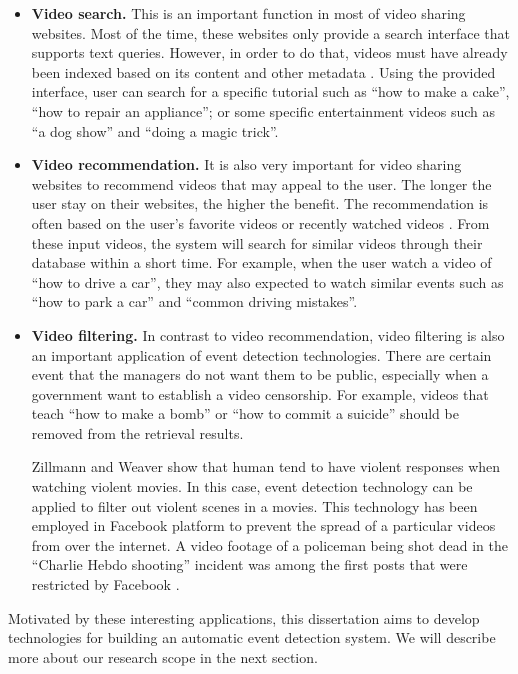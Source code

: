 \begin{itemize}
	\item \textbf{Video search.} This is an important function in most of video sharing websites. Most of the time, these websites only provide a search interface that supports text queries. However, in order to do that, videos must have already been indexed based on its content and other metadata \cite{zhang1997integrated}. Using the provided interface, user can search for a specific tutorial such as ``how to make a cake'',  ``how to repair an appliance''; or some specific entertainment videos such as ``a dog show'' and ``doing a magic trick''.
	\item \textbf{Video recommendation.} It is also very important for video sharing websites to recommend videos that may appeal to the user. The longer the user stay on their websites, the higher the benefit. The recommendation is often based on the user's favorite videos or recently watched videos \cite{davidson2010youtube,mei2007automatic}. From these input videos, the system will search for similar videos through their database within a short time. For example, when the user watch a video of ``how to drive a car'', they may also expected to watch similar events such as ``how to park a car'' and ``common driving mistakes''.
	\item \textbf{Video filtering.} In contrast to video recommendation, video filtering is also an important application of event detection technologies. There are certain event that the managers do not want them to be public, especially when a government want to establish a video censorship. For example, videos that teach ``how to make a bomb'' or ``how to commit a suicide'' should be removed from the retrieval results. 

	Zillmann and Weaver \cite{JASP:JASP145} show that human tend to have violent responses when watching violent movies. In this case, event detection technology can be applied to filter out violent scenes  in a movies. This technology has been employed in Facebook platform \cite{Internet3} to prevent the spread of a particular videos from over the internet. A video footage of a policeman being shot dead in the ``Charlie Hebdo shooting'' incident was among the first posts that were restricted by Facebook \cite{Internet3}. 
	
\end{itemize}

Motivated by these interesting applications, this dissertation aims to develop technologies for building an automatic event detection system. We will describe more about our research scope in the next section.

